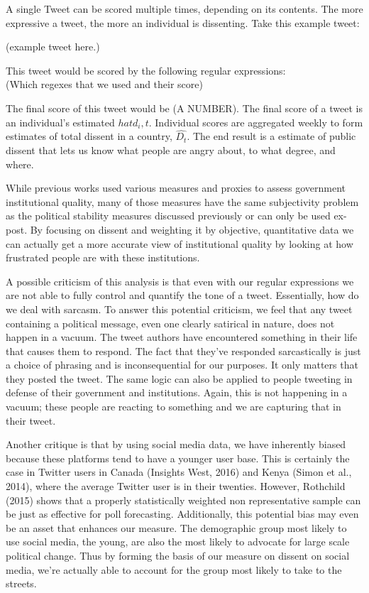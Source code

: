 \documentclass[12pt]{article}
\begin{document}
\begin{spacing}{1.5}
A single Tweet can be scored multiple times, depending on its contents. The more expressive a tweet, the more an individual is dissenting. Take this example tweet: 

\vspace{.5 em}
(example tweet here.)     

\noindent This tweet would be scored by the following regular expressions:
\vspace{.5 em}
\\
(Which regexes that we used and their score)  



The final score of this tweet would be (A NUMBER). The final score of a tweet is an individual's estimated $hat{d_i,t}$. Individual scores are aggregated weekly to form estimates of total dissent in a country, $\hat{D_t}$. The end result is a estimate of public dissent that lets us know what people are angry about, to what degree, and where. 

While previous works used various measures and proxies to assess government institutional quality, many of those measures have the same subjectivity problem as the political stability measures discussed previously or can only be used ex-post. By focusing on dissent and weighting it by objective, quantitative data we can actually get a more accurate view of institutional quality by looking at how frustrated people are with these institutions. 

A possible criticism of this analysis is that even with our regular expressions we are not able to fully control and quantify the tone of a tweet. Essentially, how do we deal with sarcasm. To answer this potential criticism, we feel that any tweet containing a political message, even one clearly satirical in nature, does not happen in a vacuum. The tweet authors have encountered something in their life that causes them to respond. The fact that they've responded sarcastically is just a choice of phrasing and is inconsequential for our purposes. It only matters that they posted the tweet. The same logic can also be applied to people tweeting in defense of their government and institutions. Again, this is not happening in a vacuum; these people are reacting to something and we are capturing that in their tweet.   

Another critique is that by using social media data, we have inherently biased because these platforms tend to have a younger user base. This is certainly the case in Twitter users in Canada (Insights West, 2016) and Kenya (Simon et al., 2014), where the average Twitter user is in their twenties. However, Rothchild (2015) shows that a properly statistically weighted non representative sample can be just as effective for poll forecasting. Additionally, this potential bias may even be an asset that enhances our measure. The demographic group most likely to use social media, the young, are also the most likely to advocate for large scale political change. Thus by forming the basis of our measure on dissent on social media, we're actually able to account for the group most likely to take to the streets.


\end{spacing}
\end{document}

